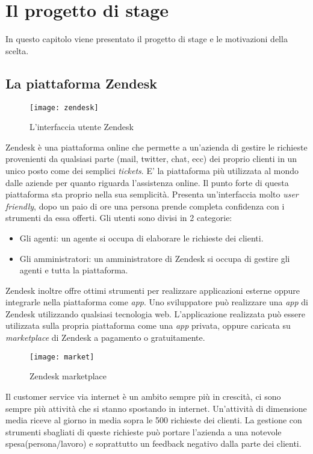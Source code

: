 
\chapter{Il progetto di stage}

\label{cap:progetto}
In questo capitolo viene presentato il progetto di stage e le motivazioni della scelta.
\section{La piattaforma Zendesk}
\begin{figure}[!h] 
	\centering 
	\texttt{[image: zendesk]} 
	\caption{L'interfaccia utente Zendesk}
\end{figure}
Zendesk è una piattaforma online che permette a un'azienda di gestire le richieste provenienti da qualsiasi parte (mail, twitter, chat, ecc) dei proprio clienti in un unico posto come dei semplici \emph{tickets}. E' la piattaforma più utilizzata al mondo dalle aziende per quanto riguarda l'assistenza online. Il punto forte di questa piattaforma sta proprio nella sua semplicità. Presenta un'interfaccia molto \emph{user friendly}, dopo un paio di ore una persona prende completa confidenza con i strumenti da essa offerti. Gli utenti sono divisi in 2 categorie:
	\begin{itemize}
		\item Gli agenti: un agente si occupa di elaborare le richieste dei clienti. 
		\item Gli amministratori: un amministratore di Zendesk si occupa di gestire gli agenti e tutta la piattaforma. 
	\end{itemize}
\newpage
Zendesk inoltre offre ottimi strumenti per realizzare applicazioni esterne oppure integrarle nella piattaforma come \emph{app}. Uno sviluppatore può realizzare una \emph{app} di Zendesk utilizzando qualsiasi tecnologia web. L'applicazione realizzata può essere utilizzata sulla propria piattaforma come una \emph{app} privata, oppure caricata su \emph{marketplace} di Zendesk a pagamento o gratuitamente.  
 
\begin{figure}[!h] 
	\centering 
	\texttt{[image: market]} 
	\caption{Zendesk marketplace}
	\end{figure}

Il customer service via internet è un ambito sempre più in crescità, ci sono sempre più attività che si stanno spostando in internet. Un'attività di dimensione media riceve al giorno in media sopra le 500 richieste dei clienti. La gestione con strumenti sbagliati di queste richieste può portare l'azienda a una notevole spesa(persona/lavoro) e soprattutto un feedback negativo dalla parte dei clienti. 

